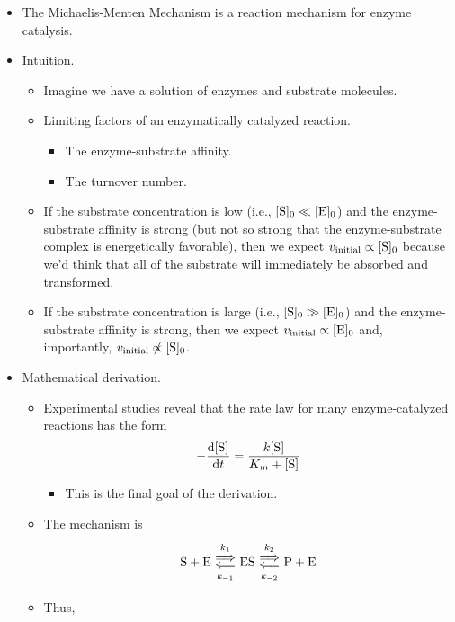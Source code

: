 \documentclass[../notes.tex]{subfiles}
\begin{document}
\begin{itemize}
    \item The Michaelis-Menten Mechanism is a reaction mechanism for enzyme catalysis.
    \item Intuition.
    \begin{itemize}
        \item Imagine we have a solution of enzymes and substrate molecules.
        \item Limiting factors of an enzymatically catalyzed reaction.
        \begin{itemize}
            \item The enzyme-substrate affinity.
            \item The turnover number.
        \end{itemize}
        \item If the substrate concentration is low (i.e., $\cnc[0]{S}\ll\cnc[0]{E}$) and the enzyme-substrate affinity is strong (but not so strong that the enzyme-substrate complex is energetically favorable), then we expect $v_\text{initial}\propto\cnc[0]{S}$ because we'd think that all of the substrate will immediately be absorbed and transformed.
        \item If the substrate concentration is large (i.e., $\cnc[0]{S}\gg\cnc[0]{E}$) and the enzyme-substrate affinity is strong, then we expect $v_\text{initial}\propto\cnc[0]{E}$ and, importantly, $v_\text{initial}\not\propto\cnc[0]{S}$.
    \end{itemize}
    \item Mathematical derivation.
    \begin{itemize}
        \item Experimental studies reveal that the rate law for many enzyme-catalyzed reactions has the form
        \begin{equation*}
            -\dv{\cnc{S}}{t} = \frac{k\cnc{S}}{K_m+\cnc{S}}
        \end{equation*}
        \begin{itemize}
            \item This is the final goal of the derivation.
        \end{itemize}
        \item The mechanism is
        \begin{equation*}
            \ce{S + E} \Longleftrightarrows[k_1][k_{-1}] \ce{ES}
            \Longleftrightarrows[k_2][k_{-2}] \ce{P + E}
        \end{equation*}
        \item Thus,
        \begin{gather*}

\end{gather*}
\end{itemize}
\end{itemize}
\end{document}
